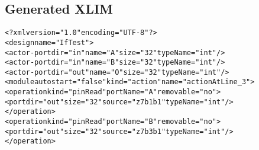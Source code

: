 \subsection{Generated XLIM}
\begin{alltt}
<?xml version="1.0" encoding="UTF-8"?>
<design name="IfTest">
  <actor-port dir="in" name="A" size="32" typeName="int"/>
  <actor-port dir="in" name="B" size="32" typeName="int"/>
  <actor-port dir="out" name="O" size="32" typeName="int"/>
  <module autostart="false" kind="action" name="actionAtLine\_3">
    <operation kind="pinRead" portName="A" removable="no">
      <port dir="out" size="32" source="z7b1b1" typeName="int"/>
    </operation>
    <operation kind="pinRead" portName="B" removable="no">
      <port dir="out" size="32" source="z7b3b1" typeName="int"/>
    </operation>
    

\end{alltt}
